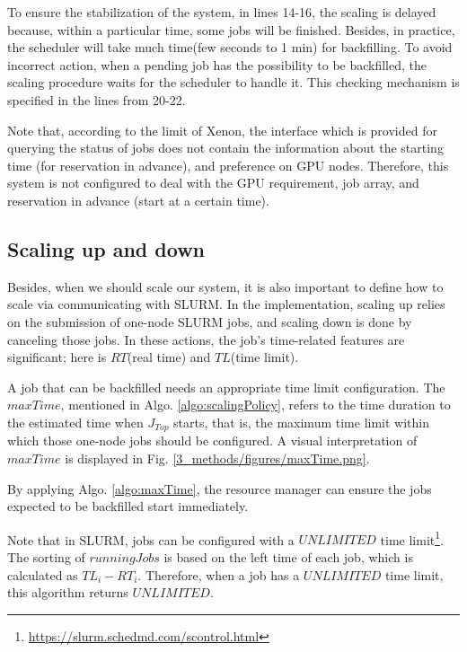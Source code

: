 To ensure the stabilization of the system, in lines 14-16, the scaling is delayed because, within a particular time, some jobs will be finished. 
Besides, in practice, the scheduler will take much time(few seconds to 1 min) for backfilling. 
To avoid incorrect action, when a pending job has the possibility to be backfilled, the scaling procedure waits for the scheduler to handle it.
This checking mechanism is specified in the lines from 20-22.

Note that, according to the limit of Xenon, the interface which is provided for querying the status of jobs does not contain the information about the starting time (for reservation in advance), and preference on GPU nodes.
Therefore, this system is not configured to deal with the GPU requirement, job array, and reservation in advance (start at a certain time).

\subsection{Scaling up and down}
Besides, when we should scale our system, it is also important to define how to scale via communicating with SLURM.
In the implementation, scaling up relies on the submission of one-node SLURM jobs, and scaling down is done by canceling those jobs.
In these actions, the job’s time-related features are significant; here is $ RT $(real time) and $ TL $(time limit).

A job that can be backfilled needs an appropriate time limit configuration.
The $maxTime$, mentioned in \hypertarget{Algo1}{Algo.} \ref{algo:scalingPolicy}, refers to the time duration to the estimated time when  $J_{Top}$ starts, that is, the maximum time limit within which those one-node jobs should be configured. 
A visual interpretation of $maxTime$ is displayed in Fig. \ref{3_methods/figures/maxTime.png}.


By applying \hypertarget{Algo2}{Algo.} \ref{algo:maxTime}, the resource manager can ensure the jobs expected to be backfilled start immediately.


Note that in SLURM, jobs can be configured with a $UNLIMITED$ time limit\footnote{\url{https://slurm.schedmd.com/scontrol.html}}. The sorting of $runningJobs$ is based on the left time of each job, which is calculated as $TL_{i}-RT_{i}$.
Therefore, when a job has a $UNLIMITED$ time limit, this algorithm returns $UNLIMITED$.

